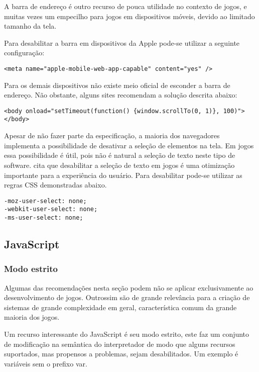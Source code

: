 \begin{draft}
\begin{draft}
A barra de endereço é outro recurso de pouca utilidade no contexto de
jogos, e muitas vezes um empecilho para jogos em dispositivos móveis,
devido ao limitado tamanho da tela.

Para desabilitar a barra em dispositivos da Apple pode-se utilizar a
seguinte configuração:

\begin{verbatim}
<meta name="apple-mobile-web-app-capable" content="yes" />
\end{verbatim}

Para os demais dispositivos não existe meio oficial de esconder a barra
de endereço. Não obstante, alguns sites recomendam a solução descrita abaixo:

\begin{verbatim}
<body onload="setTimeout(function() {window.scrollTo(0, 1)}, 100)">
</body>
\end{verbatim}

Apesar de não fazer parte da especificação, a maioria dos navegadores
implementa a possibilidade de desativar a seleção de elementos na tela.
Em jogos essa possibilidade é útil, pois não é natural a seleção de texto
neste tipo de software. \cite{html5mostwanted} cita que desabilitar
a seleção de texto em jogos é uma otimização importante para a
experiência do usuário. Para desabilitar pode-se utilizar as regras
CSS demonstradas abaixo.

\begin{verbatim}
-moz-user-select: none;
-webkit-user-select: none;
-ms-user-select: none;
\end{verbatim}

\subsection{JavaScript}
\subsubsection{Modo estrito}
Algumas das recomendações nesta seção podem não se aplicar
exclusivamente ao desenvolvimento de jogos. Outrossim são de grande
relevância para a criação de sistemas de grande complexidade em geral,
característica comum da grande maioria dos jogos.

Um recurso interessante do JavaScript é seu modo estrito, este faz
um conjunto de modificação na semântica do interpretador de modo
que alguns recursos suportados, mas propensos a problemas, sejam
desabilitados. Um exemplo é variáveis sem o prefixo var.


\end{draft}
\end{draft}
